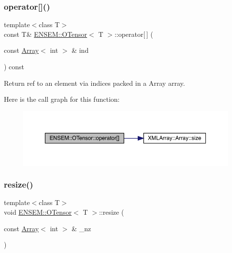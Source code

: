 \subsubsection{\texorpdfstring{operator[]()}{operator[]()}\hspace{0.1cm}{\footnotesize\ttfamily [6/6]}}
{\footnotesize\ttfamily template$<$class T$>$ \\
const T\& \mbox{\hyperlink{classENSEM_1_1OTensor}{E\+N\+S\+E\+M\+::\+O\+Tensor}}$<$ T $>$\+::operator\mbox{[}$\,$\mbox{]} (\begin{DoxyParamCaption}\item[{const \mbox{\hyperlink{classXMLArray_1_1Array}{Array}}$<$ int $>$ \&}]{ind }\end{DoxyParamCaption}) const\hspace{0.3cm}{\ttfamily [inline]}}



Return ref to an element via indices packed in a Array array. 

Here is the call graph for this function\+:
\nopagebreak
\begin{figure}[H]
\begin{center}
\leavevmode
\includegraphics[width=350pt]{da/d8a/classENSEM_1_1OTensor_aa649ae52fc364d173eb02db2fbee8172_cgraph}
\end{center}
\end{figure}
\mbox{\label{classENSEM_1_1OTensor_abe0bd734d08b1140d7794ec760a89435}} 
\subsubsection{\texorpdfstring{resize()}{resize()}\hspace{0.1cm}{\footnotesize\ttfamily [1/6]}}
{\footnotesize\ttfamily template$<$class T$>$ \\
void \mbox{\hyperlink{classENSEM_1_1OTensor}{E\+N\+S\+E\+M\+::\+O\+Tensor}}$<$ T $>$\+::resize (\begin{DoxyParamCaption}\item[{const \mbox{\hyperlink{classXMLArray_1_1Array}{Array}}$<$ int $>$ \&}]{\+\_\+nz }\end{DoxyParamCaption})\hspace{0.3cm}{\ttfamily [inline]}}



